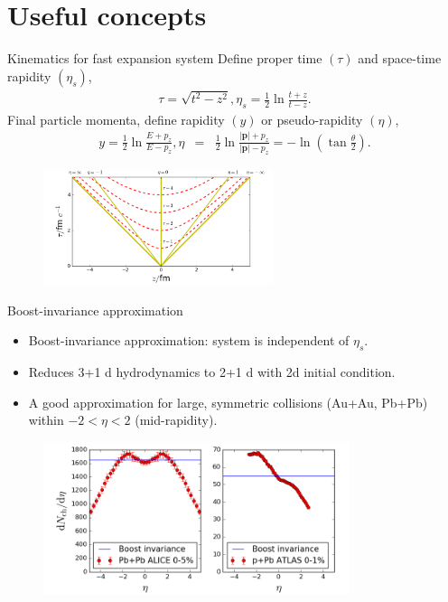\documentclass[11pt]{beamer}
\begin{document}
\section{Useful concepts}
\begin{frame}{Kinematics for fast expansion system}
Define proper time $(\tau)$ and space-time rapidity $(\eta_s)$,
\begin{eqnarray}
\nonumber
\tau = \sqrt{t^2 - z^2}, \eta_s = \frac{1}{2}\ln\frac{t+z}{t-z}. 
\end{eqnarray}
Final particle momenta, define rapidity $(y)$ or pseudo-rapidity $(\eta)$,
\begin{eqnarray}
\nonumber
 y = \frac{1}{2}\ln\frac{E+p_z}{E-p_z}, \eta &=& \frac{1}{2}\ln\frac{|\mathbf{p}|+p_z}{|\mathbf{p}|-p_z} = -\ln\left(\tan\frac{\theta}{2}\right). 
\end{eqnarray}
\begin{center}
\begin{figure}
\includegraphics[width=0.6\textwidth]{./pics/curv.png}
\end{figure}
\end{center}
\end{frame}

\begin{frame}{Boost-invariance approximation}
\begin{itemize}
\item Boost-invariance approximation: system is independent of $\eta_s$.
\item Reduces 3+1 d hydrodynamics to 2+1 d with 2d initial condition.
\item A good approximation for large, symmetric collisions (Au+Au, Pb+Pb) within $-2 < \eta < 2$ (mid-rapidity).
\end{itemize}
\begin{center}
\begin{figure}
\includegraphics[width=0.8\textwidth]{./pics/bi.png}
\end{figure}
\end{center}
\end{frame}
\end{document}
